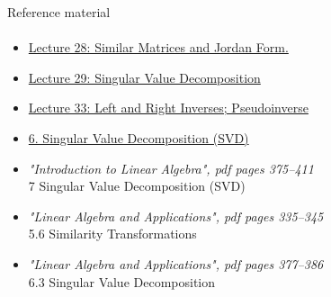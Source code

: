 \documentclass[aspectratio=169]{beamer}
\newcommand{\fbckg}[1]{\usebackgroundtemplate{\texttt{[image: \#1]}}}%
\begin{document}
\begin{frame}[t]{Reference material}
    \framesubtitle{}
    \large
    \begin{itemize}
        \item \href{https://www.youtube.com/watch?v=TSdXJw83kyA}{Lecture 28: Similar Matrices and Jordan Form.}
        \item \href{https://www.youtube.com/watch?v=Nx0lRBaXoz4&list=PL49CF3715CB9EF31D&index=30}{Lecture 29: Singular Value Decomposition}
        \item \href{https://www.youtube.com/watch?v=Go2aLo7ZOlU&list=PL49CF3715CB9EF31D&index=34}{Lecture 33: Left and Right Inverses; Pseudoinverse}
        \item \href{https://www.youtube.com/watch?v=rYz83XPxiZo&list=PLUl4u3cNGP63oMNUHXqIUcrkS2PivhN3k&index=8}{6. Singular Value Decomposition (SVD)}
        \item \textit{"Introduction to Linear Algebra", pdf pages 375--411 }\\  7 Singular Value Decomposition (SVD)
        \item \textit{"Linear Algebra and Applications", pdf pages 335--345 }\\ 5.6 Similarity Transformations
        \item \textit{"Linear Algebra and Applications", pdf pages 377--386 }\\ 6.3 Singular Value Decomposition
    \end{itemize}
\end{frame}

\fbckg{fibeamer/figs/last_page.png}
\frame[plain]{}
\end{document}
